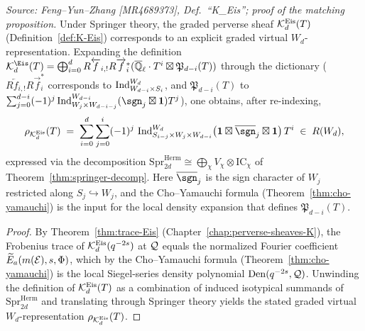 \begin{lemma}
  \label{lem:wd-eis-formula}
  \textit{Source: Feng--Yun--Zhang [MR4689373], Def.~``K\_Eis''; proof of the matching proposition.}
  Under Springer theory, the graded perverse sheaf
  \(\mathcal{K}_d^{\mathrm{Eis}}(T)\) (Definition~\ref{def:K-Eis}) corresponds to an explicit
  graded virtual \(W_d\)-representation. Expanding the definition
  \(\cK^{\Eis}_{d}(T)=\bigoplus_{i=0}^{d} R\overleftarrow{f}_{i,!}R\overrightarrow{f}^{*}_{i}
  (\Ql \cdot T^{i} \boxtimes \mathfrak{P}_{d-i}(T))\) through the dictionary
  (\(R\overleftarrow{f}_{i,!}R\overrightarrow{f}^{*}_{i}\) corresponds to
  \(\operatorname{Ind}_{W_{d-i}\times S_i}^{W_d}\), and
  \(\mathfrak{P}_{d-i}(T)\) to
  \(\sum_{j=0}^{d-i}(-1)^j \Ind_{W_j\times W_{d-i-j}}^{W_{d-i}}(\sgn_j\boxtimes\mathbf{1})T^j\)),
  one obtains, after re-indexing,
  \[
    \rho_{\cK_d^{\mathrm{Eis}}}(T)
    \;=\;
    \sum_{i=0}^{d} \sum_{j=0}^{i} (-1)^j\,
      \Ind_{S_{i-j} \times W_j \times W_{d-i}}^{W_d}
      \bigl(\mathbf{1} \boxtimes \overline{\sgn}_{j} \boxtimes \mathbf{1}\bigr)\, T^{i}
    \;\in\; R(W_d),
  \]
  expressed via the decomposition
  \(\mathrm{Spr}^{\mathrm{Herm}}_{2d} \cong \bigoplus_\chi V_\chi \otimes \mathrm{IC}_\chi\)
  of Theorem~\ref{thm:springer-decomp}. Here \(\overline{\sgn}_j\) is the sign character
  of \(W_j\) restricted along \(S_j \hookrightarrow W_j\), and the Cho--Yamauchi formula
  (Theorem~\ref{thm:cho-yamauchi}) is the input for the local density expansion that
  defines \(\mathfrak{P}_{d-i}(T)\).
\end{lemma}

\begin{proof}
  By Theorem~\ref{thm:trace-Eis} (Chapter~\ref{chap:perverse-sheaves-K}), the Frobenius
  trace of \(\mathcal{K}_d^{\mathrm{Eis}}(q^{-2s})\) at \(\mathcal{Q}\) equals the normalized Fourier
  coefficient \(\widetilde{E}_a(m(\mathcal{E}), s, \Phi)\), which by the Cho--Yamauchi formula
  (Theorem~\ref{thm:cho-yamauchi}) is the local Siegel-series density polynomial
  \(\operatorname{Den}(q^{-2s}, \mathcal{Q})\). Unwinding the definition of \(\mathcal{K}_d^{\mathrm{Eis}}(T)\) as a
  combination of induced isotypical summands of \(\mathrm{Spr}^{\mathrm{Herm}}_{2d}\)
  and translating through Springer theory yields the stated graded virtual
  \(W_d\)-representation \(\rho_{\mathcal{K}_d^{\mathrm{Eis}}}(T)\).
\end{proof}

